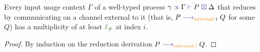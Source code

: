 \begin{nilemma}
  \label{lm:comm-capable}
  Every input usage context $\Gamma$ of a well-typed process $\types{\gamma}{\Gamma}{P}{\Delta}$ that reduces by communicating on a channel external to it (that is, $P \reduce{\constr{external} \; i} Q$ for some $Q$) has a multiplicity of at least $\lio$ at index $i$.
\end{nilemma}

\begin{proof}
  By induction on the reduction derivation $P \reduce{\constr{external \; i}}Q$.
\end{proof}